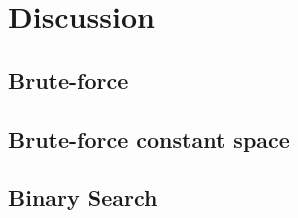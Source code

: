 \section{Discussion}
\label{kth_smallest_in_sorted_matrix:sec:discussion}


\subsection{Brute-force}
\label{kth_smallest_in_sorted_matrix:sec:bruteforce}



\subsection{Brute-force constant space}
\label{kth_smallest_in_sorted_matrix:sec:bruteforce_constant_space}




\subsection{Binary Search}
\label{kth_smallest_in_sorted_matrix:sec:binarysearch}



